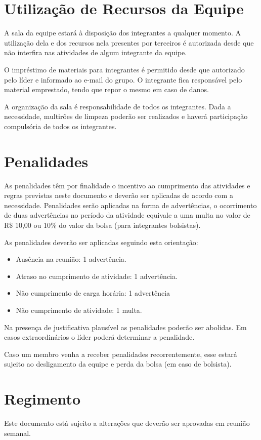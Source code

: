 \chapter{Utilização de Recursos da Equipe}
\label{chp:recursos}

A sala da equipe estará à disposição dos integrantes a qualquer momento. A utilização dela e dos recursos nela presentes por terceiros é autorizada desde que não interfira nas atividades de algum integrante da equipe.

O impréstimo de materiais para integrantes é permitido desde que autorizado pelo líder e informado ao e-mail do grupo. O integrante fica responsável pelo material emprestado, tendo que repor o mesmo em caso de danos.

A organização da sala é responsabilidade de todos os integrantes. Dada a necessidade, multirões de limpeza poderão ser realizados e haverá participação compulsória de todos os integrantes.

\chapter{Penalidades}
\label{chp:penalidades}
As penalidades têm por finalidade o incentivo ao cumprimento das atividades e regras previstas neste documento e deverão ser aplicadas de acordo com a necessidade. Penalidades serão aplicadas na forma de advertências, o ocorrimento de duas advertências  no período da atividade equivale a uma multa no valor de R\$ 10,00 ou 10\% do valor da bolsa (para integrantes bolsistas).

As penalidades deverão ser aplicadas seguindo esta orientação:
\begin{itemize}
\item[] Ausência na reunião: 1 advertência.
\item[] Atraso no cumprimento de atividade: 1 advertência.
\item[] Não cumprimento de carga horária: 1 advertência
\item[] Não cumprimento de atividade: 1 multa.
\end{itemize}
Na presença de justificativa plausível as penalidades poderão ser abolidas. Em casos extraordinários o líder poderá determinar a penalidade.

Caso um membro venha a receber penalidades recorrentemente, esse estará sujeito ao desligamento da equipe e perda da bolsa (em caso de bolsista).


\chapter{Regimento}
\label{chp:regimento}

Este documento está sujeito a alterações que deverão ser aprovadas em reunião semanal.